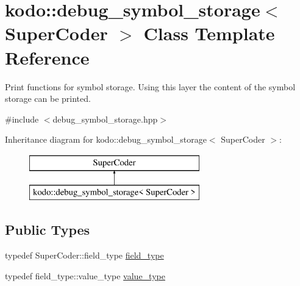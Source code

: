 \hypertarget{classkodo_1_1debug__symbol__storage}{\section{kodo\-:\-:debug\-\_\-symbol\-\_\-storage$<$ Super\-Coder $>$ Class Template Reference}
\label{classkodo_1_1debug__symbol__storage}
}


Print functions for symbol storage. Using this layer the content of the symbol storage can be printed.  




{\ttfamily \#include $<$debug\-\_\-symbol\-\_\-storage.\-hpp$>$}

Inheritance diagram for kodo\-:\-:debug\-\_\-symbol\-\_\-storage$<$ Super\-Coder $>$\-:\begin{figure}[H]
\begin{center}
\leavevmode
\includegraphics[height=2.000000cm]{classkodo_1_1debug__symbol__storage}
\end{center}
\end{figure}
\subsection*{Public Types}
\begin{DoxyCompactItemize}
\item 
typedef Super\-Coder\-::field\-\_\-type \hyperlink{classkodo_1_1debug__symbol__storage_a7736af8ae93d35e1fb1afef311b1d351}{field\-\_\-type}
\begin{DoxyCompactList}\small\item\em \end{DoxyCompactList}\item 
typedef field\-\_\-type\-::value\-\_\-type \hyperlink{classkodo_1_1debug__symbol__storage_a326cf277cc18223b60788238f9478c78}{value\-\_\-type}
\begin{DoxyCompactList}\small\item\em \end{DoxyCompactList}\end{DoxyCompactItemize}
